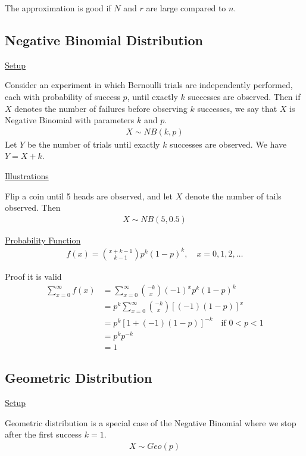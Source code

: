 \documentclass{article}
\begin{document}
The approximation is good if $N$ and $r$ are large compared to $n$. 

\subsection{Negative Binomial Distribution}

\underline{Setup}

Consider an experiment in which Bernoulli trials are independently performed, each with probability of success $p$, until exactly $k$ successes are observed. Then if $X$ denotes the number of failures before observing $k$ successes, we say that $X$ is Negative Binomial with parameters $k$ and $p$. 
\begin{align*}
    X \sim NB(k,p)
\end{align*}
Let $Y$ be the number of trials until exactly $k$ successes are observed. We have $Y = X + k$.

\underline{Illustrations}

Flip a coin until 5 heads are observed, and let $X$ denote the number of tails observed. Then
\begin{align*}
    X \sim NB(5,0.5)
\end{align*}

\underline{Probability Function}
\begin{align*}
    f(x) = \binom{x + k-1}{k-1}p^k(1-p)^k, \quad x = 0,1,2,\ldots
\end{align*}

Proof it is valid
\begin{align*}
    \sum_{x=0}^{\infty}f(x) &= \sum_{x=0}^{\infty}\binom{-k}{x}(-1)^xp^k(1-p)^k\\
    &= p^k \sum_{x=0}^{\infty}\binom{-k}{x}[(-1)(1-p)]^x \\
    &= p^k[1 + (-1)(1-p)]^{-k} \quad \text{if } 0 < p < 1\\
    &= p^kp^{-k}\\
    &= 1
\end{align*}


\subsection{Geometric Distribution}

\underline{Setup}

Geometric distribution is a special case of the Negative Binomial where we stop after the first success $k=1$.
\begin{align*}
    X \sim Geo(p)
\end{align*}
\end{document}
